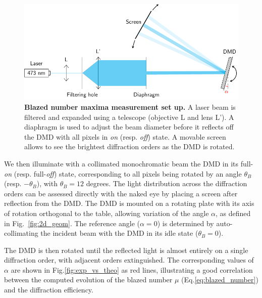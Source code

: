 \documentclass[12pt]{iopart}
\begin{document}
\begin{figure}[!ht]
  \centering
  \includegraphics[width = \textwidth]{paper/images/set_up_blaze.pdf}
  \caption{
    \textbf{Blazed number maxima measurement set up.
    }
    A laser beam is filtered and expanded using a telescope (objective L and lens L'). A diaphragm is used to adjust the beam diameter before it reflects off the DMD with all pixels in \textit{on} (resp. \textit{off}) state. A movable screen allows to see the brightest diffraction orders as the DMD is rotated. 
  }
  \label{fig:setup_diff}
\end{figure}

We then illuminate  with a collimated monochromatic beam the DMD in its full-\textit{on} (resp. full-\textit{off}) state, 
corresponding to all pixels being rotated by an angle $\theta_B$ (resp. $-\theta_B$), 
with $\theta_B=12$ degrees.
The light distribution across the diffraction orders can be assessed directly with the naked eye by placing a screen after reflection from the DMD. 
The DMD is mounted on a rotating plate with its axis of rotation orthogonal to the table, allowing variation of the angle $\alpha$, as defined in Fig.~\ref{fig:2d_geom}. The reference angle ($\alpha = 0$) is determined by auto-collimating the incident beam with the DMD in its idle state ($\theta_B = 0$).

The DMD is then rotated until the reflected light is almost entirely on a single diffraction order, with adjacent orders extinguished. 
The corresponding values of $\alpha$  are shown in Fig.\ref{fig:exp_vs_theo} as red lines, 
illustrating a good correlation between the computed evolution of 
the blazed number $\mu$ (Eq.\ref{eq:blazed_number}) 
and the diffraction efficiency.
\end{document}
